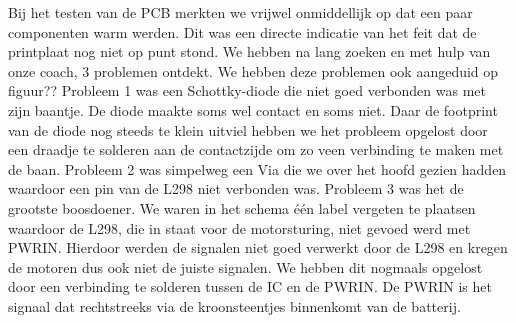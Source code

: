 Bij het testen van de PCB merkten we vrijwel onmiddellijk op dat een paar componenten warm werden. Dit was een directe indicatie van het feit dat de printplaat nog niet op punt stond. We hebben na lang zoeken en met hulp van onze coach, 3 problemen ontdekt. We hebben deze problemen ook aangeduid op figuur??%
Probleem 1 was een Schottky-diode die niet goed verbonden was met zijn baantje. De diode maakte soms wel contact en soms niet. Daar de footprint van de diode nog steeds te klein uitviel hebben we het probleem opgelost door een draadje te solderen aan de contactzijde om zo veen verbinding te maken met de baan.
Probleem 2 was simpelweg een Via die we over het hoofd gezien hadden waardoor een pin van de L298 niet verbonden was. 
Probleem 3 was het de grootste boosdoener. We waren in het schema \'e\'en label vergeten te plaatsen waardoor de L298, die in staat voor de motorsturing, niet gevoed werd met PWRIN. Hierdoor werden de signalen niet goed verwerkt door de L298 en kregen de motoren dus ook niet de juiste signalen. We hebben dit nogmaals opgelost door een verbinding te solderen tussen de IC en de PWRIN. De PWRIN is het signaal dat rechtstreeks via de kroonsteentjes binnenkomt van de batterij.




